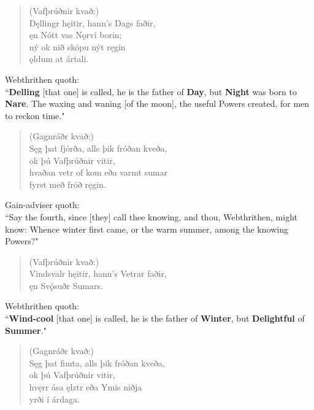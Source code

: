 \begin{verse}
(Vafþrúðnir kvað:) \\%
\bva Dęllingr hęitir, \hld hann's Dags faðir, \\%
\ind ęn Nótt vas Nǫrvi borin; \\%
ný ok nið \hld skópu nýt ręgin \\%
\ind ǫldum at ártali.\\%
\end{verse}

\bvb Webthrithen quoth: \\ “\textbf{Delling} [that one] is called, he is the father of \textbf{Day}, but \textbf{Night} was born to \textbf{Nare}. The waxing and waning [of the moon], the useful Powers created, for men to reckon time." \\

\begin{verse}
(Gagnráðr kvað:) \\%
\bva Sęg þat fjórða, \hld alls þik fróðan kveða, \\%
\ind ok þú Vafþrúðnir vitir, \\%
hvaðan vetr of kom \hld eða varmt sumar \\%
\ind fyrst með fróð ręgin.\\%
\end{verse}

\bvb Gain-adviser quoth: \\ “Say the fourth, since [they] call thee knowing, and thou, Webthrithen, might know: Whence winter first came, or the warm summer, among the knowing Powers?" \\

\begin{verse}
(Vafþrúðnir kvað:) \\%
\bva Vindsvalr hęitir, \hld hann's Vetrar faðir, \\%
\ind ęn Svǫ́suðr Sumars.\footnotemark[15]\\%
\end{verse}

\bvb Webthrithen quoth: \\ “\textbf{Wind-cool} [that one] is called, he is the father of \textbf{Winter}, but \textbf{Delightful} of \textbf{Summer}." \\

\begin{verse}
(Gagnráðr kvað:) \\%
\bva Sęg þat fimta, \hld alls þik fróðan kveða, \\%
\ind ok þú Vafþrúðnir vitir, \\%
hvęrr ása ęlztr \hld eða Ymis niðja \\%
\ind yrði í árdaga.\\%
\end{verse}

